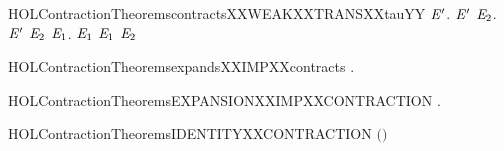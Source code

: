 \newcommand{\HOLContractionTheoremscontractsXXWEAKXXTRANSXXtau}{\UseVerbatim{HOLContractionTheoremscontractsXXWEAKXXTRANSXXtau}}
\begin{SaveVerbatim}{HOLContractionTheoremscontractsXXWEAKXXTRANSXXtauYY}
\HOLTokenTurnstile{} \HOLSymConst{\HOLTokenForall{}} \ensuremath{\HOLBoundVar{E}\sp{\prime}}.
         \ensuremath{\HOLBoundVar{E}\sp{\prime}} \HOLSymConst{\HOLTokenImp{}}
       \HOLSymConst{\HOLTokenForall{}} \ensuremath{\HOLBoundVar{E}\sb{\mathrm{2}}}. \ensuremath{\HOLBoundVar{E}\sp{\prime}} \HOLTokenWeakTransBegin\HOLConst{\ensuremath{\tau}}\HOLTokenWeakTransEnd \ensuremath{\HOLBoundVar{E}\sb{\mathrm{2}}} \HOLSymConst{\HOLTokenImp{}} \HOLSymConst{\HOLTokenExists{}}\ensuremath{\HOLBoundVar{E}\sb{\mathrm{1}}}.   \ensuremath{\HOLBoundVar{E}\sb{\mathrm{1}}} \HOLSymConst{\HOLTokenConj{}}  \ensuremath{\HOLBoundVar{E}\sb{\mathrm{1}}} \ensuremath{\HOLBoundVar{E}\sb{\mathrm{2}}}
\end{SaveVerbatim}
\newcommand{\HOLContractionTheoremscontractsXXWEAKXXTRANSXXtauYY}{\UseVerbatim{HOLContractionTheoremscontractsXXWEAKXXTRANSXXtauYY}}
\begin{SaveVerbatim}{HOLContractionTheoremsexpandsXXIMPXXcontracts}
\HOLTokenTurnstile{} \HOLSymConst{\HOLTokenForall{}} .    \HOLSymConst{\HOLTokenImp{}}   
\end{SaveVerbatim}
\newcommand{\HOLContractionTheoremsexpandsXXIMPXXcontracts}{\UseVerbatim{HOLContractionTheoremsexpandsXXIMPXXcontracts}}
\begin{SaveVerbatim}{HOLContractionTheoremsEXPANSIONXXIMPXXCONTRACTION}
\HOLTokenTurnstile{} \HOLSymConst{\HOLTokenForall{}}.   \HOLSymConst{\HOLTokenImp{}}  
\end{SaveVerbatim}
\newcommand{\HOLContractionTheoremsEXPANSIONXXIMPXXCONTRACTION}{\UseVerbatim{HOLContractionTheoremsEXPANSIONXXIMPXXCONTRACTION}}
\begin{SaveVerbatim}{HOLContractionTheoremsIDENTITYXXCONTRACTION}
\HOLTokenTurnstile{}  \ensuremath{(}\HOLSymConst{\ensuremath{=}}\ensuremath{)}
\end{SaveVerbatim}
\newcommand{\HOLContractionTheoremsIDENTITYXXCONTRACTION}{\UseVerbatim{HOLContractionTheoremsIDENTITYXXCONTRACTION}}
